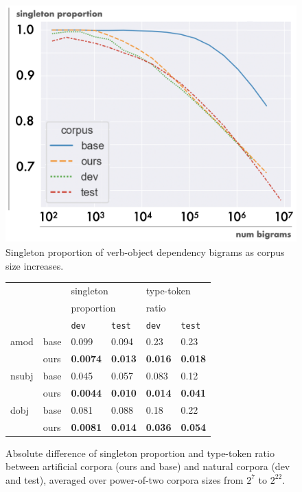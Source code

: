 \documentclass[11pt]{article}
\begin{document}
\begin{figure}[t]
\centering
\includegraphics[width=.48\textwidth]{images/sp_curve_test.png}
\caption{Singleton proportion of verb-object dependency bigrams as corpus size increases.}
\label{fig:sp_curve_test}
\end{figure}

\begin{figure}[t]
\centering
\begin{tabular}{ll||ll|ll} 
&&\multicolumn{2}{l|}{singleton}&\multicolumn{2}{l}{type-token}\\
&&\multicolumn{2}{l|}{proportion}&\multicolumn{2}{l}{ratio}\\
\cline{3-6}
&&\texttt{dev}&\texttt{test}&\texttt{dev}&\texttt{test}\\
\hline \hline
amod & base & 0.099 & 0.094 & 0.23 & 0.23 \\
& ours & \textbf{0.0074} & \textbf{0.013} & \textbf{0.016} & \textbf{0.018} \\
\hline
nsubj & base & 0.045 & 0.057 & 0.083 & 0.12 \\
& ours & \textbf{0.0044} & \textbf{0.010} & \textbf{0.014} & \textbf{0.041} \\
\hline
dobj & base & 0.081 & 0.088 & 0.18 & 0.22 \\
& ours & \textbf{0.0081} & \textbf{0.014} & \textbf{0.036} & \textbf{0.054} 
\end{tabular}
\caption{Absolute difference of singleton proportion and type-token ratio between artificial corpora (ours and base) and natural corpora (dev and test), averaged over power-of-two corpora sizes from $2^7$ to $2^{22}$. \label{fig:abs_avg_table}}
\end{figure}

\end{document}
